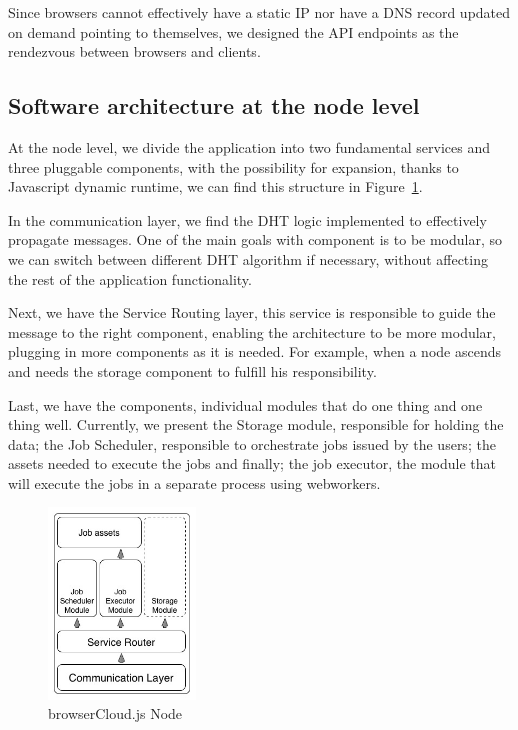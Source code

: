 Since browsers cannot effectively have a static IP nor have a DNS record updated on demand pointing to themselves, we designed the API endpoints as the rendezvous between browsers and clients.

\subsection{Software architecture at the node level}

At the node level, we divide the application into two fundamental services and three pluggable components, with the possibility for expansion, thanks to Javascript dynamic runtime, we can find this structure in Figure~\ref{fig:hcnode}.

In the communication layer, we find the DHT logic implemented to effectively propagate messages. One of the main goals with component is to be modular, so we can switch between different DHT algorithm if necessary, without affecting the rest of the application functionality.

Next, we have the Service Routing layer, this service is responsible to guide the message to the right component, enabling the architecture to be more modular, plugging in more components as it is needed. For example, when a node ascends and needs the storage component to fulfill his responsibility.

Last, we have the components, individual modules that do one thing and one thing well. Currently, we present the Storage module, responsible for holding the data; the Job Scheduler, responsible to orchestrate jobs issued by the users; the assets needed to execute the jobs and finally; the job executor, the module that will execute the jobs in a separate process using webworkers.


\begin{figure}[h!]
  \centering
  \includegraphics[width=0.35\textwidth]{img/node.jpg}
  \caption{browserCloud.js Node}
  \label{fig:hcnode}
\end{figure}

